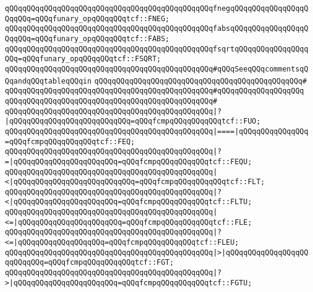 \verb|qQQqqQQqqQQqqQQqqQQqqQQqqQQqqQQqqQQqqQQqqQQqqQQqfnegqQQqqQQqqQQqqQQqqQQqqQQq=qQQqfunary_opqQQqqQQqtcf::FNEG;|\newline
\verb|qQQqqQQqqQQqqQQqqQQqqQQqqQQqqQQqqQQqqQQqqQQqqQQqfabsqQQqqQQqqQQqqQQqqQQqqQQq=qQQqfunary_opqQQqqQQqtcf::FABS;|\newline
\verb|qQQqqQQqqQQqqQQqqQQqqQQqqQQqqQQqqQQqqQQqqQQqqQQqfsqrtqQQqqQQqqQQqqQQqqQQq=qQQqfunary_opqQQqqQQqtcf::FSQRT;|\newline
\newline
\verb|qQQqqQQqqQQqqQQqqQQqqQQqqQQqqQQqqQQqqQQqqQQqqQQq#qQQqSeeqQQqcommentsqQQqandqQQqtableqQQqin|\newline
\verb|qQQqqQQqqQQqqQQqqQQqqQQqqQQqqQQqqQQqqQQqqQQqqQQq#|\newline
\verb|qQQqqQQqqQQqqQQqqQQqqQQqqQQqqQQqqQQqqQQqqQQqqQQq#qQQqqQQqqQQqqQQqqQQq|\newline
\verb|qQQqqQQqqQQqqQQqqQQqqQQqqQQqqQQqqQQqqQQqqQQqqQQq#|\newline
\verb|qQQqqQQqqQQqqQQqqQQqqQQqqQQqqQQqqQQqqQQqqQQqqQQq|\verb#|?|qQQqqQQqqQQqqQQqqQQqqQQqqQQq=qQQqfcmpqQQqqQQqqQQqtcf::FUO;#\newline
\verb|qQQqqQQqqQQqqQQqqQQqqQQqqQQqqQQqqQQqqQQqqQQqqQQq|\verb#|====|qQQqqQQqqQQqqQQq=qQQqfcmpqQQqqQQqqQQqtcf::FEQ;#\newline
\verb|qQQqqQQqqQQqqQQqqQQqqQQqqQQqqQQqqQQqqQQqqQQqqQQq|\verb#|?=|qQQqqQQqqQQqqQQqqQQqqQQq=qQQqfcmpqQQqqQQqqQQqtcf::FEQU;#\newline
\verb|qQQqqQQqqQQqqQQqqQQqqQQqqQQqqQQqqQQqqQQqqQQqqQQq|\verb#|<|qQQqqQQqqQQqqQQqqQQqqQQqqQQq=qQQqfcmpqQQqqQQqqQQqtcf::FLT;#\newline
\verb|qQQqqQQqqQQqqQQqqQQqqQQqqQQqqQQqqQQqqQQqqQQqqQQq|\verb#|?<|qQQqqQQqqQQqqQQqqQQqqQQq=qQQqfcmpqQQqqQQqqQQqtcf::FLTU;#\newline
\verb|qQQqqQQqqQQqqQQqqQQqqQQqqQQqqQQqqQQqqQQqqQQqqQQq|\verb#|<=|qQQqqQQqqQQqqQQqqQQqqQQq=qQQqfcmpqQQqqQQqqQQqtcf::FLE;#\newline
\verb|qQQqqQQqqQQqqQQqqQQqqQQqqQQqqQQqqQQqqQQqqQQqqQQq|\verb#|?<=|qQQqqQQqqQQqqQQqqQQq=qQQqfcmpqQQqqQQqqQQqtcf::FLEU;#\newline
\verb|qQQqqQQqqQQqqQQqqQQqqQQqqQQqqQQqqQQqqQQqqQQqqQQq|\verb#|>|qQQqqQQqqQQqqQQqqQQqqQQqqQQq=qQQqfcmpqQQqqQQqqQQqtcf::FGT;#\newline
\verb|qQQqqQQqqQQqqQQqqQQqqQQqqQQqqQQqqQQqqQQqqQQqqQQq|\verb#|?>|qQQqqQQqqQQqqQQqqQQqqQQq=qQQqfcmpqQQqqQQqqQQqtcf::FGTU;#\newline
